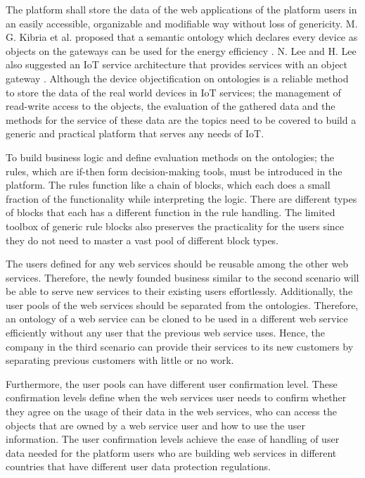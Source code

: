 The platform shall store the data of the web applications of the platform users in an easily accessible, organizable and modifiable way without loss of genericity. M. G. Kibria et al. proposed that a semantic ontology which declares every device as objects on the gateways can be used for the energy efficiency \cite{7993747}. N. Lee and H. Lee also suggested an IoT service architecture that provides services with an object gateway \cite{6884496}. Although the device objectification on ontologies is a reliable method to store the data of the real world devices in IoT services; the management of read-write access to the objects, the evaluation of the gathered data and the methods for the service of these data are the topics need to be covered to build a generic and practical platform that serves any needs of IoT.

To build business logic and define evaluation methods on the ontologies; the rules, which are if-then form decision-making tools, must be introduced in the platform. The rules function like a chain of blocks, which each does a small fraction of the functionality while interpreting the logic.  There are different types of blocks that each has a different function in the rule handling. The limited toolbox of generic rule blocks also preserves the practicality for the users since they do not need to master a vast pool of different block types.

The users defined for any web services should be reusable among the other web services. Therefore, the newly founded business similar to the second scenario will be able to serve new services to their existing users effortlessly. Additionally, the user pools of the web services should be separated from the ontologies. Therefore, an ontology of a web service can be cloned to be used in a different web service efficiently without any user that the previous web service uses. Hence, the company in the third scenario can provide their services to its new customers by separating previous customers with little or no work.

Furthermore, the user pools can have different user confirmation level. These confirmation levels define when the web services user needs to confirm whether they agree on the usage of their data in the web services, who can access the objects that are owned by a web service user and how to use the user information. The user confirmation levels achieve the ease of handling of user data needed for the platform users who are building web services in different countries that have different user data protection regulations.


